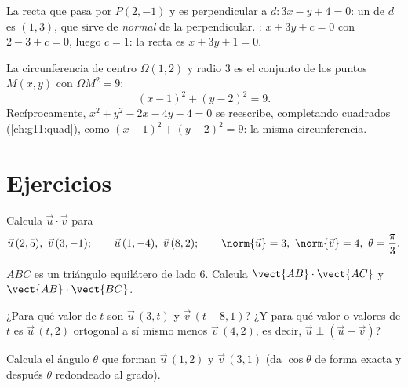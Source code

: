 \begin{example}\label{ex:g11:scal:perpline}
La recta que pasa por $P(2, -1)$ y es perpendicular a
$d : 3x - y + 4 = 0$: un  de $d$ es $(1, 3)$, que sirve de
 \emph{normal} de la perpendicular. : $x + 3y + c = 0$ con
$2 - 3 + c = 0$, luego $c = 1$: la recta es $x + 3y + 1 = 0$.
\end{example}

\begin{example}\label{ex:g11:scal:circle}
La circunferencia de centro $\Omega(1, 2)$ y radio $3$ es el conjunto de
los puntos $M(x,y)$ con $\Omega M^2 = 9$:
\[
(x - 1)^2 + (y - 2)^2 = 9 .
\]
Recíprocamente, $x^2 + y^2 - 2x - 4y - 4 = 0$ se reescribe, completando
cuadrados (\cref{ch:g11:quad}), como $(x-1)^2 + (y-2)^2 = 9$: la misma
circunferencia.
\end{example}

\section{Ejercicios}

\begin{exercise}[$\star$]\label{exo:g11:scal:1}
Calcula $\vec u \cdot \vec v$ para
\[
\vec u\,(2, 5),\ \vec v\,(3, -1); \qquad
\vec u\,(1, -4),\ \vec v\,(8, 2); \qquad
\norm{\vec u} = 3,\ \norm{\vec v} = 4,\ \theta = \frac{\pi}{3} .
\]
\end{exercise}

\begin{exercise}[$\star$]\label{exo:g11:scal:2}
$ABC$ es un triángulo equilátero de lado $6$. Calcula
$\vect{AB} \cdot \vect{AC}$ y $\vect{AB} \cdot \vect{BC}$.
\end{exercise}

\begin{exercise}[$\star$]\label{exo:g11:scal:3}
¿Para qué valor de $t$ son  $\vec u\,(3, t)$ y
$\vec v\,(t - 8, 1)$? ¿Y para qué valor o valores de $t$ es
$\vec u\,(t, 2)$ ortogonal a sí mismo menos $\vec v\,(4, 2)$, es decir,
$\vec u \perp (\vec u - \vec v)$?
\end{exercise}

\begin{exercise}[$\star$]\label{exo:g11:scal:4}
Calcula el ángulo $\theta$ que forman $\vec u\,(1, 2)$ y $\vec v\,(3, 1)$
(da $\cos\theta$ de forma exacta y después $\theta$ redondeado al grado).
\end{exercise}

